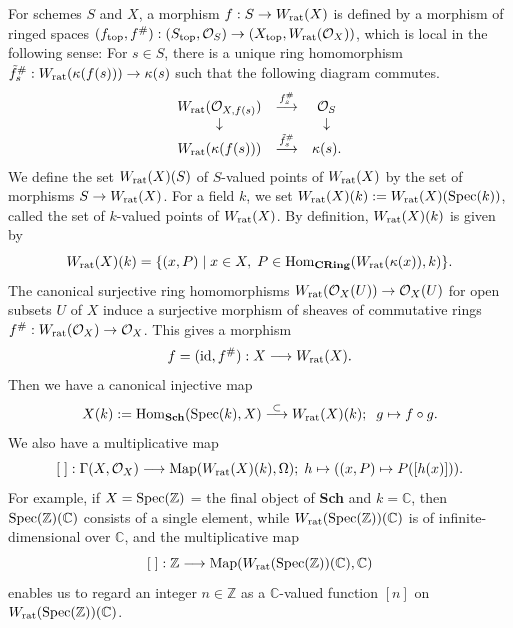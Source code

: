 \documentclass[12pt, leqno]{article}
\begin{document}
For  schemes $S$ and $X$, a morphism $f : S \rightarrow W_{\rm rat}(X)$ is defined by a morphism of ringed spaces $(f_{\rm top}, f^{\#}) : (S_{\rm top}, {\cal O}_S) \rightarrow (X_{\rm top}, W_{\rm rat}({\cal O}_X))$, which is local in the following sense: For $s \in S$, there is a unique ring homomorphism $\tilde{f}^{\#}_s : W_{\rm rat}(\kappa(f(s))) \rightarrow \kappa(s)$
such that the following  diagram commutes.
$$  \begin{array}{ccc}
W_{\rm rat}({\cal O}_{X, f(s)}) & \stackrel{ f^{\#}_s}{\longrightarrow} & {\cal O}_S \\
\downarrow & & \downarrow \\
W_{\rm rat}(\kappa(f(s))) & \stackrel{ \tilde{f}^{\#}_s}{\longrightarrow} & \kappa(s).
\end{array}
$$
We define the set  $W_{\rm rat}(X)(S)$ of $S$-valued points of $W_{\rm rat}(X)$ by the set of morphisms $S \rightarrow W_{\rm rat}(X)$. 
For a field $k$, we set $W_{\rm rat}(X)(k) := W_{\rm rat}(X)({\rm Spec}(k))$, called the set of $k$-valued points of $W_{\rm rat}(X)$.  
By definition, $W_{\rm rat}(X)(k)$ is given by 
$$  W_{\rm rat}(X)(k) = \{ (x, P)  \mid  x \in X, \; P \in {\rm Hom}_{\bf CRing}(W_{\rm rat}(\kappa(x)), k) \}. $$
The canonical surjective ring homomorphisms $W_{\rm rat}({\cal O}_X(U)) \rightarrow {\cal O}_X(U)$ for open subsets $U$ of $X$ induce a surjective morphism of sheaves  of commutative rings $ f^{\#} : W_{\rm rat}({\cal O}_X) \rightarrow {\cal O}_X$. This gives a morphism
$$ f = ({\rm id}, f^{\#}) : X \longrightarrow W_{\rm rat}(X).$$
Then  we have a canonical injective map 
$$ X(k) := {\rm Hom}_{\bf Sch}({\rm Spec}(k), X) \stackrel{\subset}{\longrightarrow} W_{\rm rat}(X)(k); \;\; g  \mapsto f \circ g.$$
We also have a multiplicative map
$$ [\; ] : \Gamma(X, {\cal O}_X) \longrightarrow {\rm Map}(W_{\rm rat}(X)(k), \Omega);\; h \mapsto ((x, P) \mapsto P([h(x)])).$$
For example, if  $X = {\rm Spec}(\mathbb{Z})$ = the final object of {\bf Sch} and $k = \mathbb{C}$,  then ${\rm Spec}(\mathbb{Z})(\mathbb{C})$ consists of a single element, while $W_{\rm rat}({\rm Spec}(\mathbb{Z}))(\mathbb{C})$ is of infinite-dimensional over $\mathbb{C}$, and the  multiplicative map
$$ [\; ] : \mathbb{Z} \longrightarrow {\rm Map}(W_{\rm rat}({\rm Spec}(\mathbb{Z}))(\mathbb{C}), \mathbb{C}) $$
 enables us to regard  an integer $n \in \mathbb{Z}$  as a $\mathbb{C}$-valued function $[n]$ on $W_{\rm rat}({\rm Spec}(\mathbb{Z}))(\mathbb{C})$. \\
\end{document}
